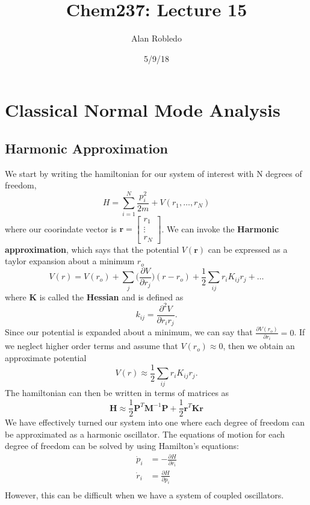 \documentclass{article}
\title{Chem237: Lecture 15}
\date{5/9/18}
\author{Alan Robledo}
\newcommand{\be}{\begin{equation}}
\newcommand{\ee}{\end{equation}}
\newcommand{\br}{\textbf{r}}
\newcommand{\bp}{\textbf{P}}
\newcommand{\bm}{\textbf{M}}
\newcommand{\bk}{\textbf{K}}
\begin{document}
\maketitle

\section{Classical Normal Mode Analysis}

\subsection{Harmonic Approximation}
We start by writing the hamiltonian for our system of interest with N degrees of freedom,
\be
  H = \sum_{i = 1}^{N} \frac{p^2_i}{2 m} + V(r_1, \dots, r_N)
\ee
where our coorindate vector is $\br = \begin{bmatrix} r_1 \\ \vdots \\ r_N \end{bmatrix}$.
We can invoke the \textbf{Harmonic approximation}, which says that the potential $V(\br)$ can be expressed as a taylor expansion about a minimum $r_o$
\be
  V(r) = V(r_o) + \sum_j \Big( \frac{\partial V}{\partial r_j} \Big) (r - r_o) + \frac{1}{2} \sum_{i j} r_i K_{i j} r_j + \dots
\ee
where $\bk$ is called the \textbf{Hessian} and is defined as
\be
  k_{i j} = \frac{\partial^2 V}{\partial r_i r_j} .
\ee
Since our potential is expanded about a minimum, we can say that $\frac{\partial V(r_o)}{\partial r_i} = 0$.
If we neglect higher order terms and assume that $V(r_o) \approx 0$, then we obtain an approximate potential
\be
  V(r) \approx \frac{1}{2} \sum_{i j} r_i K_{i j} r_j .
\ee
The hamiltonian can then be written in terms of matrices as
\be
  \textbf{H} \approx \frac{1}{2} \bp^T \bm^{-1} \bp + \frac{1}{2} \textbf{r}^{T} \bk \textbf{r}
\ee
We have effectively turned our system into one where each degree of freedom can be approximated as a harmonic oscillator.
The equations of motion for each degree of freedom can be solved by using Hamilton's equations:
\be
  \begin{split}
    \dot{p}_i &= - \frac{\partial H}{\partial r_i} \\
    \dot{r}_i &= \frac{\partial H}{\partial p_i} \\
  \end{split}
\ee
However, this can be difficult when we have a system of coupled oscillators.
\end{document}
